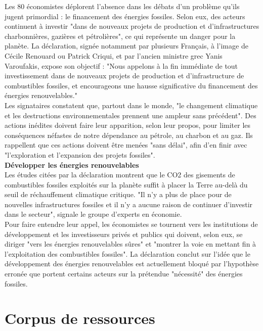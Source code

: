 \documentclass[8pt]{article}
\begin{document}
Les 80 économistes déplorent l'absence dans les débats d'un problème qu'ils jugent primordial : le financement des énergies fossiles. Selon eux, des acteurs continuent à investir "dans de nouveaux projets de production et d’infrastructures charbonnières, gazières et pétrolières", ce qui représente un danger pour la planète. La déclaration, signée notamment par plusieurs Français, à l’image de Cécile Renouard ou Patrick Criqui, et par l'ancien ministre grec Yanis Varoufakis, expose son objectif :
"Nous appelons à la fin immédiate de tout investissement dans de nouveaux projets de production et d'infrastructure de combustibles fossiles, et encourageons une hausse significative du financement des énergies renouvelables."\\

Les signataires constatent que, partout dans le monde, "le changement climatique et les destructions environnementales prennent une ampleur sans précédent". Des actions inédites doivent faire leur apparition, selon leur propos, pour limiter les conséquences néfastes de notre dépendance au pétrole, au charbon et au gaz. Ils rappellent que ces actions doivent être menées "sans délai", afin d’en finir avec "l’exploration et l’expansion des projets fossiles".\\

\textbf{Développer les énergies renouvelables}\\

Les études citées par la déclaration montrent que le CO2 des gisements de combustibles fossiles exploités sur la planète suffit à placer la Terre au-delà du seuil de réchauffement climatique critique. "Il n’y a plus de place pour de nouvelles infrastructures fossiles et il n’y a aucune raison de continuer d’investir dans le secteur", signale le groupe d’experts en économie.\\

Pour faire entendre leur appel, les économistes se tournent vers les institutions de développement et les investisseurs privés et publics qui doivent, selon eux, se diriger "vers les énergies renouvelables sûres" et "montrer la voie en mettant fin à l’exploitation des combustibles fossiles". La déclaration conclut sur l’idée que le développement des énergies renouvelables est actuellement bloqué par l’hypothèse erronée que portent certains acteurs sur la prétendue "nécessité" des énergies fossiles.\\

\newpage


\section{Corpus de ressources}
\end{document}
